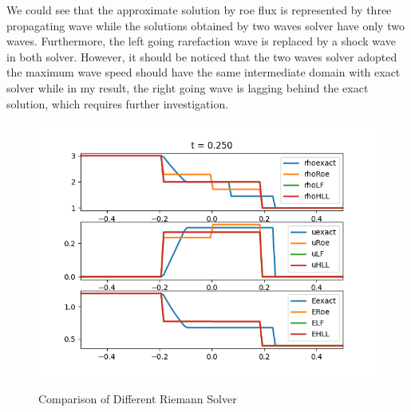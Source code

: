 \documentclass[11pt]{diazessay} %
\begin{document}
We could see that the approximate solution by roe flux is represented by three propagating wave while the solutions obtained by two waves solver have only two waves. Furthermore, the left going rarefaction wave is replaced by a shock wave in both solver. However, it should be noticed that the two waves solver adopted the maximum wave speed should have the same intermediate domain with exact solver while in my result, the right going wave is lagging behind the exact solution, which requires further investigation.

\begin{figure}[h!]
    \centering
    \includegraphics[scale=0.8]{comparison.png}
    \label{fig:shocktube}
    \caption{Comparison of Different Riemann Solver}
\end{figure}


\clearpage



\end{document}
